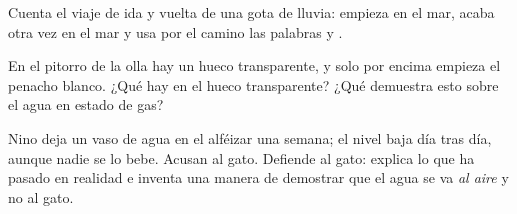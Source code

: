 \begin{exercise}[$\star$]\label{exo:g2:ice-water-steam:8}
Cuenta el viaje de ida y vuelta de una gota de lluvia: empieza en el
mar, acaba otra vez en el mar y usa por el camino las palabras
 y .
\end{exercise}

\begin{exercise}[$\star\star$]\label{exo:g2:ice-water-steam:9}
En el pitorro de la olla hay un hueco transparente, y solo por encima
empieza el penacho blanco. ¿Qué hay en el hueco transparente? ¿Qué
demuestra esto sobre el agua en estado de gas?
\end{exercise}

\begin{exercise}[$\star\star$]\label{exo:g2:ice-water-steam:10}
Nino deja un vaso de agua en el alféizar una semana; el nivel
baja día tras día, aunque nadie se lo bebe. Acusan al gato.
Defiende al gato: explica lo que ha pasado en realidad e inventa una
manera de demostrar que el agua se va \emph{al aire} y no al gato.
\end{exercise}
